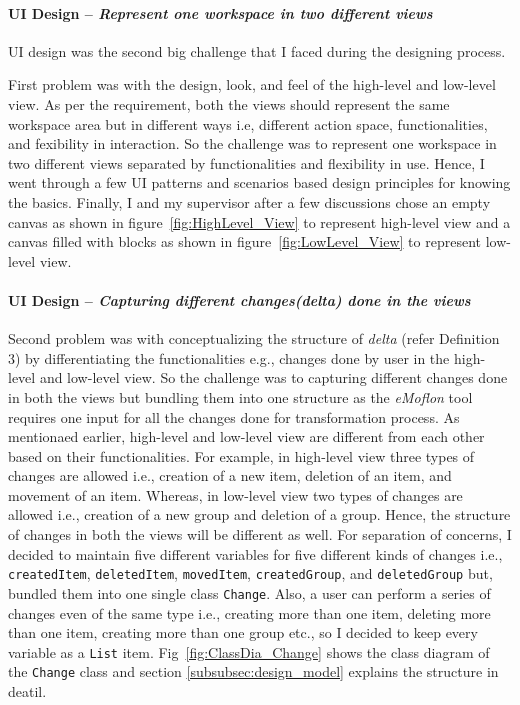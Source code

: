\paragraph{UI Design -- \textit{Represent one workspace in two different views}}
UI design was the second big challenge that I faced during the designing process.

First problem was with the design, look, and feel of the high-level and low-level view. As per the requirement, both the views should represent the same workspace area but in different ways i.e, different action space, functionalities, and fexibility in interaction. So the challenge was to represent one workspace in two different views separated by functionalities and flexibility in use. Hence, I went through a few UI patterns \cite{designinterfaces} and scenarios based design principles \cite{scenariobasedui} for knowing the basics. Finally, I and my supervisor after a few discussions chose an empty canvas as shown in figure~\ref{fig:HighLevel_View} to represent high-level view and a canvas filled with blocks as shown in figure~\ref{fig:LowLevel_View} to represent low-level view.

\paragraph{UI Design -- \textit{Capturing different changes(delta) done in the views}}
Second problem was with conceptualizing the structure of \textit{delta} (refer Definition 3) by differentiating the functionalities e.g., changes done by user in the high-level and low-level view. So the challenge was to capturing different changes done in both the views but bundling them into one structure as the \textit{eMoflon} tool requires one input for all the changes done for transformation process. As mentionaed earlier, high-level and low-level view are different from each other based on their functionalities. For example, in high-level view three types of changes are allowed i.e., creation of a new item, deletion of an item, and movement of an item. Whereas, in low-level view two types of changes are allowed i.e., creation of a new group and deletion of a group. Hence, the structure of changes in both the views will be different as well. For separation of concerns, I decided to maintain five different variables for five different kinds of changes i.e., \texttt{createdItem}, \texttt{deletedItem}, \texttt{movedItem}, \texttt{createdGroup}, and \texttt{deletedGroup} but, bundled them into one single class \texttt{Change}. Also, a user can perform a series of changes even of the same type i.e., creating more than one item, deleting more than one item, creating more than one group etc., so I decided to keep every variable as a \texttt{List} item. Fig~\ref{fig:ClassDia_Change} shows the class diagram of the \texttt{Change} class and section \ref{subsubsec:design_model} explains the structure in deatil.


